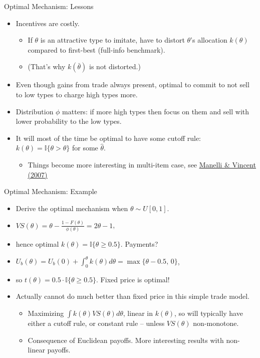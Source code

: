 \documentclass[english,10pt
,aspectratio=169
]{beamer}
\begin{document}
\begin{frame}{Optimal Mechanism: Lessons}
\begin{itemize}
	\item Incentives are costly.
	\begin{itemize}
		\item If $\theta$ is an attractive type to imitate, have to distort $\theta$'s allocation $k(\theta)$ compared to first-best (full-info benchmark).
		\item (That's why $k(\bar{\theta})$ is not distorted.)
	\end{itemize}
	\item Even though gains from trade always present, optimal to commit to not sell to low types to charge high types more.
	\item Distribution $\phi$ matters: if more high types then focus on them and sell with lower probability to the low types.
	\item It will most of the time be optimal to have some cutoff rule: $k(\theta) = \mathbb{I}\{\theta > \hat{\theta}\}$ for some $\hat{\theta}$.
	\begin{itemize}
		\item Things become more interesting in multi-item case, see \href{https://www.sciencedirect.com/science/article/pii/S0022053107000348}{\uline{Manelli \& Vincent (2007)}}
	\end{itemize}
\end{itemize}
\end{frame}


\begin{frame}{Optimal Mechanism: Example}
\begin{itemize}[<+->]
	\item Derive the optimal mechanism when $\theta \sim U[0,1]$.
	\item $VS(\theta) = \theta - \frac{1-F(\theta)}{\phi(\theta)} = 2 \theta - 1$,
	\item hence optimal $k(\theta) = \mathbb{I} \{\theta \geq 0.5 \}$. Payments?
	\item $U_b (\theta) = U_b(0) + \int_0^\theta k(\theta) d\theta = \max \{\theta - 0.5,\,0\}$,
	\item so $t(\theta) = 0.5 \cdot \mathbb{I} \{\theta \geq 0.5 \}$. Fixed price is optimal!
	\item Actually cannot do much better than fixed price in this simple trade model.
	\begin{itemize}
		\item Maximizing $\int k(\theta) VS(\theta) d\theta$, linear in $k(\theta)$, so will typically have either a cutoff rule, or constant rule -- unless $VS(\theta)$ non-monotone.
		\item Consequence of Euclidean payoffs. More interesting results with non-linear payoffs.
	\end{itemize}
\end{itemize}
\end{frame}
\end{document}
